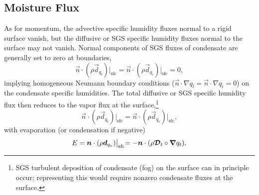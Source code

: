 \documentclass{report}
\begin{document}
\subsection{Moisture Flux}\label{s:bc_moisture_flux}

As for momentum, the advective specific humidity fluxes normal to a rigid surface vanish, but the diffusive or SGS specific humidity fluxes normal to the surface may not vanish. Normal components of SGS fluxes of condensate are generally set to zero at boundaries,
\begin{equation}\label{e:sfc_condensate_flux}
\vec{n} \cdot (\rho \vec{d}_{q_{l}})\bigl|_\mathrm{sfc} = \vec{n} \cdot (\rho \vec{d}_{q_{i}})\bigl|_\mathrm{sfc} = 0,
\end{equation}
implying homogeneous Neumann boundary conditions ($\vec{n}\cdot\nabla q_l = \vec{n}\cdot\nabla q_i = 0$) on the condensate specific humidities. The total diffusive or SGS specific humidity flux then reduces to the vapor flux at the surface,\footnote{SGS turbulent deposition of condensate (fog) on the surface can in principle occur; representing this would require nonzero condensate fluxes at the surface.}
\[
\vec{n} \cdot (\rho \vec{d}_{q_{t}})\bigl|_\mathrm{sfc} = \vec{n} \cdot (\rho \vec{d}_{q_{v}})\bigl|_\mathrm{sfc},
\]
with evaporation (or condensation if negative)
\[
E = \boldsymbol{{n}} \cdot (\rho \boldsymbol{{d}}_{q_{v}})\bigl|_\mathrm{sfc} = -\boldsymbol{{n}} \cdot (\rho \boldsymbol{{\mathcal{D}}}_t \circ \boldsymbol{{\nabla}} q_t).
\]
\end{document}
